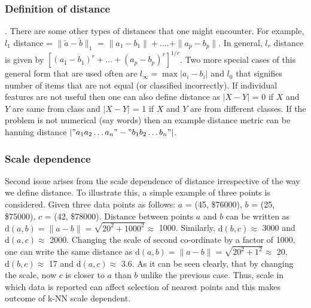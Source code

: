 \documentclass{article}
\begin{document}
\subsubsection{Definition of distance}
. There are some other types of distances that one might encounter. For example, $l_1$ distance = $\| \utilde{a} - \utilde{b} \|_1$ = $\|a_1 - b_1\| + \dots{.} + \|a_p - b_p\|$. In general, $l_r$ distance is given by $[(a_1 - b_1)^r + \dots{} + (a_p - b_p)^r]^{1/r}$. Two more special cases of this general form that are used often are $l_{\infty} = \max{|a_i - b_i|}$ and $l_0$ that signifies number of items that are not equal (or classified incorrectly). If individual features are not useful then one can also define distance as $|X - Y|$ = 0 if $X$ and $Y$ are same from class and $|X - Y|$ = 1 if $X$ and $Y$ are from different classes. If the problem is not numerical (say words) then an example distance metric can be hanning distance $|"a_1a_2\dots{}a_n" - "b_1b_2\dots{}b_n"|$.

\subsubsection{Scale dependence}
Second issue arises from the scale dependence of distance irrespective of the way we define distance. To illustrate this, a simple example of three points is considered. Given three data points as follows:
$a$ = (45, \$76000), $b$ = (25, \$75000), $c$ = (42, \$78000). Distance between points $a$ and $b$ can be written as $\mathrm{d}(a, b) = \|a - b\| = \sqrt{\mathrm{20^2} + \mathrm{1000^2}} \approx$ 1000. Similarly, $\mathrm{d}(b,c) \approx$ 3000 and $\mathrm{d}(a,c) \approx$ 2000. Changing the scale of second co-ordinate by a factor of 1000, one can write the same distance as $\mathrm{d}(a, b) = \|a - b\| = \sqrt{\mathrm{20}^2 + \mathrm{1}^2} \approx$ 20, $\mathrm{d}(b,c) \approx$ 17 and $\mathrm{d}(a, c) \approx$ 3.6. As it can be seen clearly, that by changing the scale, now $c$ is closer to $a$ than $b$ unlike the previous case. Thus, scale in which data is reported can affect selection of nearest points and this makes outcome of k-NN scale dependent. 
\end{document}
